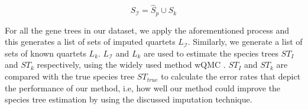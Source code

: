 \begin{equation}
\label{eq:s_i}
S_\mathcal{I} = \hat{S}_{p} \cup S_k
\end{equation}

For all the gene trees in our dataset, we apply the aforementioned process and this generates a list of sets of imputed quartets $L_\mathcal{I}$. Similarly, we generate a list of sets of known quartets $L_k$. $L_\mathcal{I}$ and $L_k$ are used to estimate the species trees $ST_I$ and $ST_k$ respectively, using the widely used method wQMC \SR{[cite]}. $ST_I$ and $ST_k$ are compared with the true species tree $ST_{true}$ to calculate the error rates that depict the performance of our method, i.e, how well our method could improve the species tree estimation by using the discussed imputation technique.




